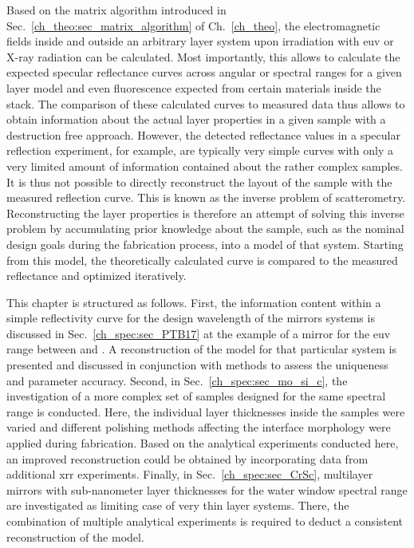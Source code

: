Based on the matrix algorithm introduced in Sec.~\ref{ch_theo:sec_matrix_algorithm} of Ch.~\ref{ch_theo}, the electromagnetic fields inside and outside an arbitrary layer system upon irradiation with \gls{euv} or X-ray radiation can be calculated. Most importantly, this allows to calculate the expected specular reflectance curves across angular or spectral ranges for a given layer model and even fluorescence expected from certain materials inside the stack. The comparison of these calculated curves to measured data thus allows to obtain information about the actual layer properties in a given sample with a destruction free approach. However, the detected reflectance values in a specular reflection experiment, for example, are typically very simple curves with only a very limited amount of information contained about the rather complex samples. It is thus not possible to directly reconstruct the layout of the sample with the measured reflection curve. This is known as the inverse problem of scatterometry. Reconstructing the layer properties is therefore an attempt of solving this inverse problem by accumulating prior knowledge about the sample, such as the nominal design goals during the fabrication process, into a model of that system. Starting from this model, the theoretically calculated curve is compared to the measured reflectance and optimized iteratively.

This chapter is structured as follows. First, the information content within a simple reflectivity curve for the design wavelength of the mirrors systems is discussed in Sec.~\ref{ch_spec:sec_PTB17} at the example of a mirror for the \gls{euv} range between  and . A reconstruction of the model for that particular system is presented and discussed in conjunction with methods to assess the uniqueness and parameter accuracy. Second, in Sec.~\ref{ch_spec:sec_mo_si_c}, the investigation of a more complex set of samples designed for the same spectral range is conducted. Here, the individual layer thicknesses inside the samples were varied and different polishing methods affecting the interface morphology were applied during fabrication. Based on the analytical experiments conducted here, an improved reconstruction could be obtained by incorporating data from additional \gls{xrr} experiments. Finally, in Sec.~\ref{ch_spec:sec_CrSc}, multilayer mirrors with sub-nanometer layer thicknesses for the water window spectral range are investigated as limiting case of very thin layer systems. There, the combination of multiple analytical experiments is required to deduct a consistent reconstruction of the model.

